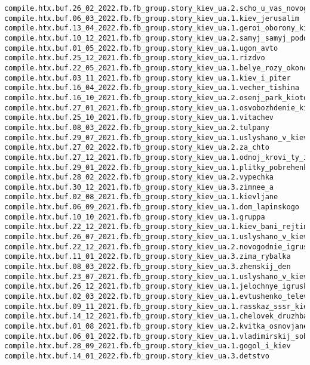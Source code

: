 \begin{Verbatim}
compile.htx.buf.26_02_2022.fb.fb_group.story_kiev_ua.2.scho_u_vas_novogo
compile.htx.buf.06_03_2022.fb.fb_group.story_kiev_ua.1.kiev_jerusalim
compile.htx.buf.13_04_2022.fb.fb_group.story_kiev_ua.1.geroi_oborony_kieva
compile.htx.buf.10_12_2021.fb.fb_group.story_kiev_ua.2.samyj_samyj_podol
compile.htx.buf.01_05_2022.fb.fb_group.story_kiev_ua.1.ugon_avto
compile.htx.buf.25_12_2021.fb.fb_group.story_kiev_ua.1.rizdvo
compile.htx.buf.22_05_2021.fb.fb_group.story_kiev_ua.1.belye_rozy_okonchanie
compile.htx.buf.03_11_2021.fb.fb_group.story_kiev_ua.1.kiev_i_piter
compile.htx.buf.16_04_2022.fb.fb_group.story_kiev_ua.1.vecher_tishina
compile.htx.buf.16_10_2021.fb.fb_group.story_kiev_ua.2.osenj_park_kioto
compile.htx.buf.27_01_2021.fb.fb_group.story_kiev_ua.1.osvobozhdenie_kieva
compile.htx.buf.25_10_2021.fb.fb_group.story_kiev_ua.1.vitachev
compile.htx.buf.08_03_2022.fb.fb_group.story_kiev_ua.2.tulpany
compile.htx.buf.29_07_2021.fb.fb_group.story_kiev_ua.1.uslyshano_v_kieve_8
compile.htx.buf.27_02_2022.fb.fb_group.story_kiev_ua.2.za_chto
compile.htx.buf.27_12_2021.fb.fb_group.story_kiev_ua.1.odnoj_krovi_ty_i_ja
compile.htx.buf.29_01_2022.fb.fb_group.story_kiev_ua.1.plitky_pobrehenki_60_70_rokiv
compile.htx.buf.28_02_2022.fb.fb_group.story_kiev_ua.2.vypechka
compile.htx.buf.30_12_2021.fb.fb_group.story_kiev_ua.3.zimnee_a
compile.htx.buf.02_08_2021.fb.fb_group.story_kiev_ua.1.kievljane
compile.htx.buf.06_09_2021.fb.fb_group.story_kiev_ua.1.dom_lapinskogo
compile.htx.buf.10_10_2021.fb.fb_group.story_kiev_ua.1.gruppa
compile.htx.buf.22_12_2021.fb.fb_group.story_kiev_ua.1.kiev_bani_rejting
compile.htx.buf.26_07_2021.fb.fb_group.story_kiev_ua.1.uslyshano_v_kieve_7
compile.htx.buf.22_12_2021.fb.fb_group.story_kiev_ua.2.novogodnie_igrushki
compile.htx.buf.11_01_2022.fb.fb_group.story_kiev_ua.3.zima_rybalka
compile.htx.buf.08_03_2022.fb.fb_group.story_kiev_ua.3.zhenskij_den
compile.htx.buf.23_07_2021.fb.fb_group.story_kiev_ua.1.uslyshano_v_kieve_4
compile.htx.buf.26_12_2021.fb.fb_group.story_kiev_ua.1.jelochnye_igruski
compile.htx.buf.02_03_2022.fb.fb_group.story_kiev_ua.1.evtushenko_televyshka
compile.htx.buf.09_11_2021.fb.fb_group.story_kiev_ua.1.rasskaz_sssr_kiev
compile.htx.buf.14_12_2021.fb.fb_group.story_kiev_ua.1.chelovek_druzhba
compile.htx.buf.01_08_2021.fb.fb_group.story_kiev_ua.2.kvitka_osnovjanenko_pismo
compile.htx.buf.06_01_2022.fb.fb_group.story_kiev_ua.1.vladimirskij_sobor
compile.htx.buf.28_09_2021.fb.fb_group.story_kiev_ua.1.gogol_i_kiev
compile.htx.buf.14_01_2022.fb.fb_group.story_kiev_ua.3.detstvo

\end{Verbatim}
